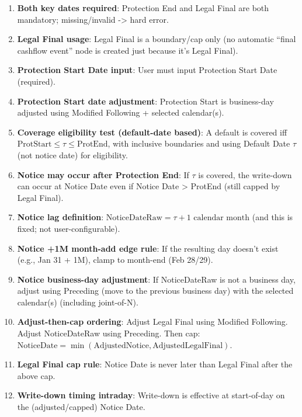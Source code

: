 \documentclass[11pt]{article}
\begin{document}
\begin{enumerate}[label=\arabic*),leftmargin=*,align=left]
\item \textbf{Both key dates required}: Protection End and Legal Final are both mandatory; missing/invalid -> hard error.

\item \textbf{Legal Final usage}: Legal Final is a boundary/cap only (no automatic “final cashflow event” node is created just because it’s Legal Final).

\item \textbf{Protection Start Date input}: User must input Protection Start Date (required).

\item \textbf{Protection Start date adjustment}: Protection Start is business-day adjusted using Modified Following + selected calendar(s).

\item \textbf{Coverage eligibility test (default-date based)}: A default is covered iff $\text{ProtStart} \le \tau \le \text{ProtEnd}$, with inclusive boundaries and using Default Date $\tau$ (not notice date) for eligibility.

\item \textbf{Notice may occur after Protection End}: If $\tau$ is covered, the write-down can occur at Notice Date even if Notice Date > ProtEnd (still capped by Legal Final).

\item \textbf{Notice lag definition}: $\text{NoticeDateRaw} = \tau + 1 \text{ calendar month}$ (and this is fixed; not user-configurable).

\item \textbf{Notice +1M month-add edge rule}: If the resulting day doesn’t exist (e.g., Jan 31 + 1M), clamp to month-end (Feb 28/29).

\item \textbf{Notice business-day adjustment}: If NoticeDateRaw is not a business day, adjust using Preceding (move to the previous business day) with the selected calendar(s) (including joint-of-N).

\item \textbf{Adjust-then-cap ordering}: Adjust Legal Final using Modified Following. Adjust NoticeDateRaw using Preceding. Then cap: $\text{NoticeDate} = \min(\text{AdjustedNotice}, \text{AdjustedLegalFinal})$.

\item \textbf{Legal Final cap rule}: Notice Date is never later than Legal Final after the above cap.

\item \textbf{Write-down timing intraday}: Write-down is effective at start-of-day on the (adjusted/capped) Notice Date.


\end{enumerate}
\end{document}
